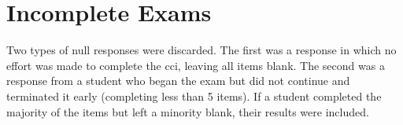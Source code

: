 \ifshort
\begin{table}[!htbp]
\centering
\caption{Breakdown of Students By University}
\label{tab:student_breakdown}
\end{table}
\fi


\iflong
\section{Incomplete Exams}

Two types of null responses were discarded. The first was a response in which no effort was made to complete the \gls{cci}, leaving all items blank. The second was a response from a student who began the exam but did not continue and terminated it early (completing less than 5 items). If a student completed the majority of the items but left a minority blank, their results were included.

\fi
